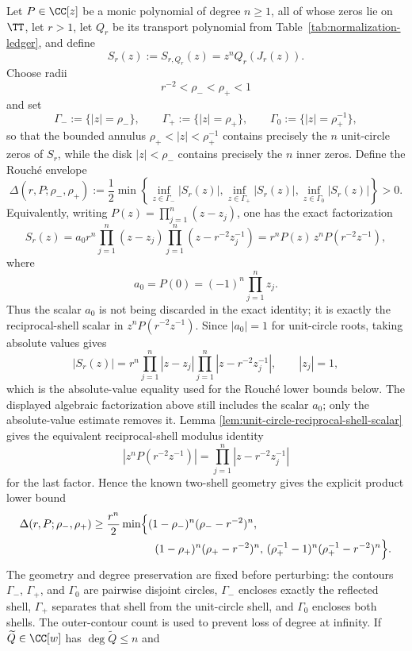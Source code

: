 \begin{theorem}\label{thm:quantitative-annular-rouche-stability}
Let \(P\in\CC[z]\) be a monic polynomial of degree \(n\ge1\), all of whose zeros lie on \(\TT\), let \(r>1\), let \(Q_r\) be its transport polynomial from Table~\ref{tab:normalization-ledger}, and define
\[
S_r(z):=S_{r,Q_r}(z)=z^nQ_r(J_r(z)).
\]
Choose radii
\[
r^{-2}<\rho_-<\rho_+<1
\]
and set
\[
\Gamma_-:=\{|z|=\rho_-\},\qquad
\Gamma_+:=\{|z|=\rho_+\},\qquad
\Gamma_0:=\{|z|=\rho_+^{-1}\},
\]
so that the bounded annulus \(\rho_+<|z|<\rho_+^{-1}\) contains precisely the \(n\) unit-circle zeros of \(S_r\), while the disk \(|z|<\rho_-\) contains precisely the \(n\) inner zeros.  Define the Rouch\'e envelope
\[
\Delta(r,P;\rho_-,\rho_+):=\frac12\min\left\{
\inf_{z\in\Gamma_-}|S_r(z)|,
\inf_{z\in\Gamma_+}|S_r(z)|,
\inf_{z\in\Gamma_0}|S_r(z)|
\right\}>0.
\]
Equivalently, writing \(P(z)=\prod_{j=1}^{n}(z-z_j)\), one has the
exact factorization
\[
S_r(z)
=a_0r^n\prod_{j=1}^{n}(z-z_j)
\prod_{j=1}^{n}(z-r^{-2}z_j^{-1})
=r^nP(z)\,z^nP(r^{-2}z^{-1}),
\]
where
\[
a_0=P(0)=(-1)^n\prod_{j=1}^{n}z_j .
\]
Thus the scalar \(a_0\) is not being discarded in the exact identity; it
is exactly the reciprocal-shell scalar in \(z^nP(r^{-2}z^{-1})\).
Since \(|a_0|=1\) for unit-circle roots, taking absolute values gives
\[
|S_r(z)|=r^n\prod_{j=1}^{n}|z-z_j|
\prod_{j=1}^{n}|z-r^{-2}z_j^{-1}|,
\qquad |z_j|=1,
\]
which is the absolute-value equality used for the Rouch\'e lower bounds below.  The
displayed algebraic factorization above still includes the scalar
\(a_0\); only the absolute-value estimate removes it.  Lemma
\ref{lem:unit-circle-reciprocal-shell-scalar} gives the
equivalent reciprocal-shell modulus identity
\[
\left|z^nP(r^{-2}z^{-1})\right|
=\prod_{j=1}^{n}|z-r^{-2}z_j^{-1}|
\]
for the last factor.  Hence the known two-shell geometry gives the
explicit product lower bound
\[
\begin{aligned}
\Delta(r,P;\rho_-,\rho_+)
&\ge
\frac{r^n}{2}\min\Bigl\{
(1-\rho_-)^n(\rho_- - r^{-2})^n,\\
&\hspace{5.7em}
(1-\rho_+)^n(\rho_+ - r^{-2})^n,\,
(\rho_+^{-1}-1)^n(\rho_+^{-1}-r^{-2})^n
\Bigr\}.
\end{aligned}
\]
The geometry and degree preservation are fixed before perturbing: the contours \(\Gamma_-\), \(\Gamma_+\), and \(\Gamma_0\) are pairwise disjoint circles, \(\Gamma_-\) encloses exactly the reflected shell, \(\Gamma_+\) separates that shell from the unit-circle shell, and \(\Gamma_0\) encloses both shells.  The outer-contour count is used to prevent loss of degree at infinity.  If \(\widetilde Q\in\CC[w]\) has \(\deg \widetilde Q\le n\) and

\end{theorem}
